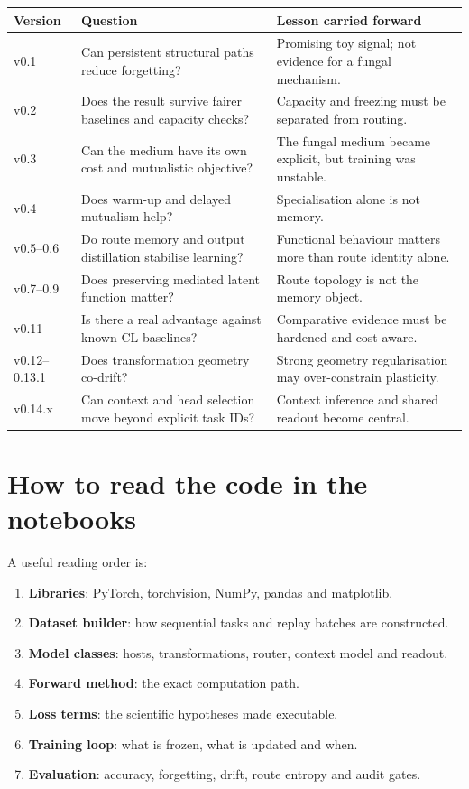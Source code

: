\documentclass[11pt,a4paper]{article}
\newcommand{\tablehead}[1]{\cellcolor{DeepTeal}\color{white}\bfseries #1}
\begin{document}
\begin{tabularx}{\textwidth}{p{1.45cm}X X}
\toprule
\tablehead{Version} & \tablehead{Question} & \tablehead{Lesson carried forward}\\
\midrule
v0.1 & Can persistent structural paths reduce forgetting? & Promising toy signal; not evidence for a fungal mechanism.\\
v0.2 & Does the result survive fairer baselines and capacity checks? & Capacity and freezing must be separated from routing.\\
v0.3 & Can the medium have its own cost and mutualistic objective? & The fungal medium became explicit, but training was unstable.\\
v0.4 & Does warm-up and delayed mutualism help? & Specialisation alone is not memory.\\
v0.5--0.6 & Do route memory and output distillation stabilise learning? & Functional behaviour matters more than route identity alone.\\
v0.7--0.9 & Does preserving mediated latent function matter? & Route topology is not the memory object.\\
v0.11 & Is there a real advantage against known CL baselines? & Comparative evidence must be hardened and cost-aware.\\
v0.12--0.13.1 & Does transformation geometry co-drift? & Strong geometry regularisation may over-constrain plasticity.\\
v0.14.x & Can context and head selection move beyond explicit task IDs? & Context inference and shared readout become central.\\
\bottomrule
\end{tabularx}

\newpage
\section{How to read the code in the notebooks}

A useful reading order is:
\begin{enumerate}[leftmargin=1.6em]
\item \textbf{Libraries}: PyTorch, torchvision, NumPy, pandas and matplotlib.
\item \textbf{Dataset builder}: how sequential tasks and replay batches are constructed.
\item \textbf{Model classes}: hosts, transformations, router, context model and readout.
\item \textbf{Forward method}: the exact computation path.
\item \textbf{Loss terms}: the scientific hypotheses made executable.
\item \textbf{Training loop}: what is frozen, what is updated and when.
\item \textbf{Evaluation}: accuracy, forgetting, drift, route entropy and audit gates.
\end{enumerate}
\end{document}
